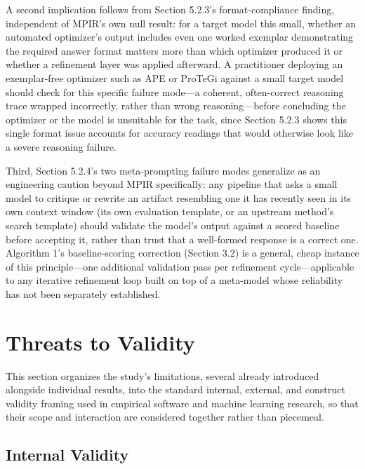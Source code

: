 \documentclass[a4paper,fleqn]{cas-sc}
\begin{document}
A second implication follows from Section 5.2.3's format-compliance finding, independent of MPIR's own null result: for a target model this small, whether an automated optimizer's output includes even one worked exemplar demonstrating the required answer format matters more than which optimizer produced it or whether a refinement layer was applied afterward. A practitioner deploying an exemplar-free optimizer such as APE or ProTeGi against a small target model should check for this specific failure mode---a coherent, often-correct reasoning trace wrapped incorrectly, rather than wrong reasoning---before concluding the optimizer or the model is unsuitable for the task, since Section 5.2.3 shows this single format issue accounts for accuracy readings that would otherwise look like a severe reasoning failure.

Third, Section 5.2.4's two meta-prompting failure modes generalize as an engineering caution beyond MPIR specifically: any pipeline that asks a small model to critique or rewrite an artifact resembling one it has recently seen in its own context window (its own evaluation template, or an upstream method's search template) should validate the model's output against a scored baseline before accepting it, rather than trust that a well-formed response is a correct one. Algorithm 1's baseline-scoring correction (Section 3.2) is a general, cheap instance of this principle---one additional validation pass per refinement cycle---applicable to any iterative refinement loop built on top of a meta-model whose reliability has not been separately established.

\section{Threats to Validity}

This section organizes the study's limitations, several already introduced alongside individual results, into the standard internal, external, and construct validity framing used in empirical software and machine learning research, so that their scope and interaction are considered together rather than piecemeal.

\subsection{Internal Validity}
\end{document}

